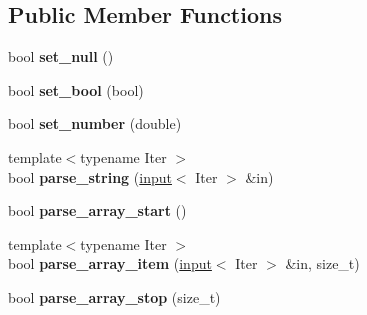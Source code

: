 \subsection*{Public Member Functions}
\begin{DoxyCompactItemize}
\item 
\hypertarget{classpicojson_1_1null__parse__context_ad142ddadd513e41324f8d0515a19df2c}{bool {\bfseries set\+\_\+null} ()}\label{classpicojson_1_1null__parse__context_ad142ddadd513e41324f8d0515a19df2c}

\item 
\hypertarget{classpicojson_1_1null__parse__context_aa77397f08cf7859fabc04e9e4460b93a}{bool {\bfseries set\+\_\+bool} (bool)}\label{classpicojson_1_1null__parse__context_aa77397f08cf7859fabc04e9e4460b93a}

\item 
\hypertarget{classpicojson_1_1null__parse__context_aeb8326108d42615b1b04cf82d510040c}{bool {\bfseries set\+\_\+number} (double)}\label{classpicojson_1_1null__parse__context_aeb8326108d42615b1b04cf82d510040c}

\item 
\hypertarget{classpicojson_1_1null__parse__context_aab2c7dee1eb5b477370832811cd40d14}{{\footnotesize template$<$typename Iter $>$ }\\bool {\bfseries parse\+\_\+string} (\hyperlink{classpicojson_1_1input}{input}$<$ Iter $>$ \&in)}\label{classpicojson_1_1null__parse__context_aab2c7dee1eb5b477370832811cd40d14}

\item 
\hypertarget{classpicojson_1_1null__parse__context_ae78f8991e157a85b7ce0fb36f9a5f628}{bool {\bfseries parse\+\_\+array\+\_\+start} ()}\label{classpicojson_1_1null__parse__context_ae78f8991e157a85b7ce0fb36f9a5f628}

\item 
\hypertarget{classpicojson_1_1null__parse__context_a6623f92117dd6dc7bca60e9e9463a1a0}{{\footnotesize template$<$typename Iter $>$ }\\bool {\bfseries parse\+\_\+array\+\_\+item} (\hyperlink{classpicojson_1_1input}{input}$<$ Iter $>$ \&in, size\+\_\+t)}\label{classpicojson_1_1null__parse__context_a6623f92117dd6dc7bca60e9e9463a1a0}

\item 
\hypertarget{classpicojson_1_1null__parse__context_a8a763b600c17c5db42aee9afb2d2551d}{bool {\bfseries parse\+\_\+array\+\_\+stop} (size\+\_\+t)}\label{classpicojson_1_1null__parse__context_a8a763b600c17c5db42aee9afb2d2551d}


\end{DoxyCompactItemize}
